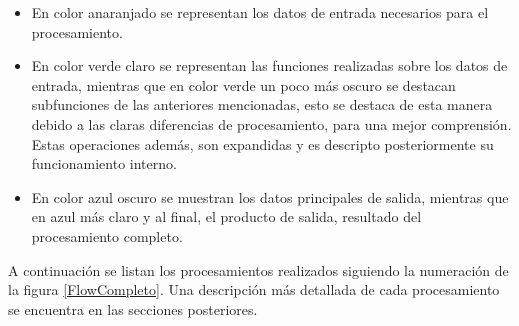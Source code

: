 \documentclass[10pt,a4paper, twoside]{report}
\begin{document}
\begin{itemize}
	\item En color anaranjado se representan los datos de entrada necesarios para el procesamiento.
	\item En color verde claro se representan las funciones realizadas sobre los datos de entrada, mientras que en color verde un poco más oscuro se destacan subfunciones de las anteriores mencionadas, esto se destaca de esta manera debido a las claras diferencias de procesamiento, para una mejor comprensión. Estas operaciones además, son expandidas y es descripto posteriormente su funcionamiento interno. 
	\item En color azul oscuro se muestran los datos principales de salida, mientras que en azul más claro y al final, el producto de salida, resultado del procesamiento completo.
\end{itemize}

A continuación se listan los procesamientos realizados siguiendo la numeración de la figura \ref{FlowCompleto}. Una descripción más detallada de cada procesamiento se encuentra en las secciones posteriores.
\end{document}
